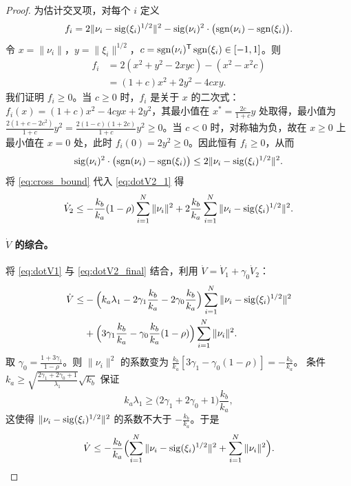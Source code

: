 \begin{proof}
    为估计交叉项，对每个 $i$ 定义
    \[
    f_i = 2\|\nu_i - \operatorname{sig}(\xi_i)^{1/2}\|^2 - \operatorname{sig}(\nu_i)^2\cdot\bigl(\operatorname{sgn}(\nu_i) - \operatorname{sgn}(\xi_i)\bigr).
    \]
    令 $x = \|\nu_i\|$，$y = \|\xi_i\|^{1/2}$，$c = \operatorname{sgn}(\nu_i)^\mathsf{T}\operatorname{sgn}(\xi_i)\in[-1,1]$。则
    \begin{align*}
        f_i &= 2(x^2 + y^2 - 2x y c) - (x^2 - x^2 c)\\
        &= (1+c)x^2 + 2y^2 - 4cxy.
    \end{align*}
    我们证明 $f_i\ge 0$。当 $c\ge 0$ 时，$f_i$ 是关于 $x$ 的二次式：$f_i(x) = (1+c)x^2 - 4c y x + 2y^2$，其最小值在 $x^* = \frac{2c}{1+c}y$ 处取得，最小值为 $\frac{2(1+c-2c^2)}{1+c}y^2 = \frac{2(1-c)(1+2c)}{1+c}y^2 \ge 0$。当 $c<0$ 时，对称轴为负，故在 $x\ge 0$ 上最小值在 $x=0$ 处，此时 $f_i(0)=2y^2\ge 0$。因此恒有 $f_i\ge 0$，从而
    \begin{equation}
        \operatorname{sig}(\nu_i)^2\cdot\bigl(\operatorname{sgn}(\nu_i) - \operatorname{sgn}(\xi_i)\bigr) \le 2\|\nu_i - \operatorname{sig}(\xi_i)^{1/2}\|^2. \label{eq:cross_bound}
    \end{equation}
    将 \eqref{eq:cross_bound} 代入 \eqref{eq:dotV2_1} 得
    \begin{equation}
        \dot{V}_2 \le -\frac{k_b}{k_a}(1-\rho)\sum_{i=1}^{N}\|\nu_i\|^2 
                   + 2\frac{k_b}{k_a}\sum_{i=1}^{N}\|\nu_i - \operatorname{sig}(\xi_i)^{1/2}\|^2. \label{eq:dotV2_final}
    \end{equation}

    \paragraph{$\dot V$ 的综合。}
    将 \eqref{eq:dotV1} 与 \eqref{eq:dotV2_final} 结合，利用 $\dot V = \dot V_1 + \gamma_0 \dot V_2$：
    \begin{align*}
        \dot V \le &-\Bigl(k_a\lambda_1 - 2\gamma_1\frac{k_b}{k_a} - 2\gamma_0\frac{k_b}{k_a}\Bigr)\sum_{i=1}^{N}\|\nu_i - \operatorname{sig}(\xi_i)^{1/2}\|^2 \\
        &+ \Bigl(3\gamma_1\frac{k_b}{k_a} - \gamma_0\frac{k_b}{k_a}(1-\rho)\Bigr)\sum_{i=1}^{N}\|\nu_i\|^2.
    \end{align*}
    取 $\gamma_0 = \frac{1+3\gamma_1}{1-\rho}$。则 $\|\nu_i\|^2$ 的系数变为 $\frac{k_b}{k_a}[3\gamma_1 - \gamma_0(1-\rho)] = -\frac{k_b}{k_a}$。
    条件 $k_a \ge \sqrt{\frac{2\gamma_1+2\gamma_0+1}{\lambda_1}}\sqrt{k_b}$ 保证
    \[
    k_a\lambda_1 \ge \bigl(2\gamma_1+2\gamma_0+1\bigr)\frac{k_b}{k_a},
    \]
    这使得 $\|\nu_i - \operatorname{sig}(\xi_i)^{1/2}\|^2$ 的系数不大于 $-\frac{k_b}{k_a}$。于是
    \begin{equation}\label{eq:V_dot}
        \dot V \le -\frac{k_b}{k_a}\Bigl(\sum_{i=1}^{N}\|\nu_i - \operatorname{sig}(\xi_i)^{1/2}\|^2 + \sum_{i=1}^{N}\|\nu_i\|^2\Bigr).
    \end{equation}


\end{proof}
